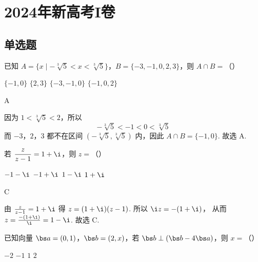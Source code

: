 
\chapter{2024年新高考I卷}

\section{单选题}

\begin{problem}
已知 \(A=\{x\mid -\sqrt[3]{5}<x<\sqrt[3]{5}\}\)，\(B=\{-3,-1,0,2,3\}\)，则 \(A\cap B=\)（\quad）

\choices
    {\(\{-1,0\}\)}
    {\(\{2,3\}\)}
    {\(\{-3,-1,0\}\)}
    {\(\{-1,0,2\}\)}
\end{problem}

\begin{answer}
A
\end{answer}

\begin{solution}
因为 \(1<\sqrt[3]{5}<2\)，所以
\[
-\sqrt[3]{5}<-1<0<\sqrt[3]{5}
\]
而 \(-3\)，\(2\)，\(3\) 都不在区间 \(\left(-\sqrt[3]{5},\sqrt[3]{5}\right)\) 内，因此
\(A\cap B=\{-1,0\}\).
故选 A.
\end{solution}

\begin{problem}
若 \(\dfrac{z}{z-1}=1+\i\)，则 \(z=\)（\quad）

\choices
    {\(-1-\i\)}
    {\(-1+\i\)}
    {\(1-\i\)}
    {\(1+\i\)}
\end{problem}

\begin{answer}
C
\end{answer}

\begin{solution}
由
\(\frac{z}{z-1}=1+\i\)
得
\(z=(1+\i)(z-1)\).
所以
\(\i z=-(1+\i)\)，
从而
\(z=\frac{-(1+\i)}{\i}=1-\i\).
故选 C.
\end{solution}

\begin{problem}
已知向量 \(\bs a=(0,1)\)，\(\bs b=(2,x)\)，若 \(\bs b\perp (\bs b-4\bs a)\)，则 \(x=\)（\quad）

\choices
    {\(-2\)}
    {\(-1\)}
    {\(1\)}
    {\(2\)}
\end{problem}

